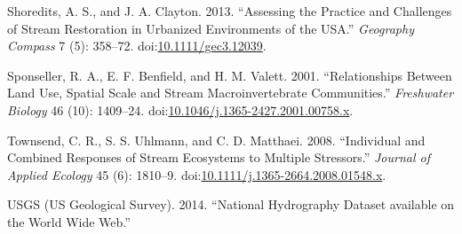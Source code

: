 \documentclass[]{article}
\begin{document}
\hypertarget{ref-Shoredits13}{}
Shoredits, A. S., and J. A. Clayton. 2013. ``Assessing the Practice and
Challenges of Stream Restoration in Urbanized Environments of the USA.''
\emph{Geography Compass} 7 (5): 358--72.
doi:\href{https://doi.org/10.1111/gec3.12039}{10.1111/gec3.12039}.

\hypertarget{ref-Sponseller01}{}
Sponseller, R. A., E. F. Benfield, and H. M. Valett. 2001.
``Relationships Between Land Use, Spatial Scale and Stream
Macroinvertebrate Communities.'' \emph{Freshwater Biology} 46 (10):
1409--24.
doi:\href{https://doi.org/10.1046/j.1365-2427.2001.00758.x}{10.1046/j.1365-2427.2001.00758.x}.

\hypertarget{ref-Townsend08}{}
Townsend, C. R., S. S. Uhlmann, and C. D. Matthaei. 2008. ``Individual
and Combined Responses of Stream Ecosystems to Multiple Stressors.''
\emph{Journal of Applied Ecology} 45 (6): 1810--9.
doi:\href{https://doi.org/10.1111/j.1365-2664.2008.01548.x}{10.1111/j.1365-2664.2008.01548.x}.

\hypertarget{ref-USGS14}{}
USGS (US Geological Survey). 2014. ``National Hydrography Dataset
available on the World Wide Web.''
\end{document}
